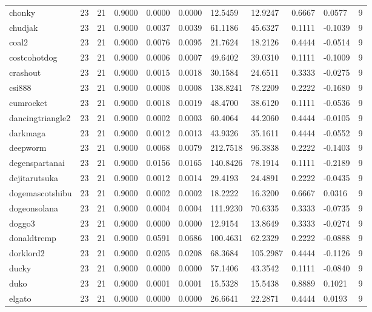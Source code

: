 \begin{table}[htbp]
\begin{tabular}{lllllllllll}
chonky & 23 & 21 & 0.9000 & 0.0000 & 0.0000 & 12.5459 & 12.9247 & 0.6667 & 0.0577 & 9 \\
chudjak & 23 & 21 & 0.9000 & 0.0037 & 0.0039 & 61.1186 & 45.6327 & 0.1111 & -0.1039 & 9 \\
coal2 & 23 & 21 & 0.9000 & 0.0076 & 0.0095 & 21.7624 & 18.2126 & 0.4444 & -0.0514 & 9 \\
costcohotdog & 23 & 21 & 0.9000 & 0.0006 & 0.0007 & 49.6402 & 39.0310 & 0.1111 & -0.1009 & 9 \\
crashout & 23 & 21 & 0.9000 & 0.0015 & 0.0018 & 30.1584 & 24.6511 & 0.3333 & -0.0275 & 9 \\
csi888 & 23 & 21 & 0.9000 & 0.0008 & 0.0008 & 138.8241 & 78.2209 & 0.2222 & -0.1680 & 9 \\
cumrocket & 23 & 21 & 0.9000 & 0.0018 & 0.0019 & 48.4700 & 38.6120 & 0.1111 & -0.0536 & 9 \\
dancingtriangle2 & 23 & 21 & 0.9000 & 0.0002 & 0.0003 & 60.4064 & 44.2060 & 0.4444 & -0.0105 & 9 \\
darkmaga & 23 & 21 & 0.9000 & 0.0012 & 0.0013 & 43.9326 & 35.1611 & 0.4444 & -0.0552 & 9 \\
deepworm & 23 & 21 & 0.9000 & 0.0068 & 0.0079 & 212.7518 & 96.3838 & 0.2222 & -0.1403 & 9 \\
degenspartanai & 23 & 21 & 0.9000 & 0.0156 & 0.0165 & 140.8426 & 78.1914 & 0.1111 & -0.2189 & 9 \\
dejitarutsuka & 23 & 21 & 0.9000 & 0.0012 & 0.0014 & 29.4193 & 24.4891 & 0.2222 & -0.0435 & 9 \\
dogemascotshibu & 23 & 21 & 0.9000 & 0.0002 & 0.0002 & 18.2222 & 16.3200 & 0.6667 & 0.0316 & 9 \\
dogeonsolana & 23 & 21 & 0.9000 & 0.0004 & 0.0004 & 111.9230 & 70.6335 & 0.3333 & -0.0735 & 9 \\
doggo3 & 23 & 21 & 0.9000 & 0.0000 & 0.0000 & 12.9154 & 13.8649 & 0.3333 & -0.0274 & 9 \\
donaldtremp & 23 & 21 & 0.9000 & 0.0591 & 0.0686 & 100.4631 & 62.2329 & 0.2222 & -0.0888 & 9 \\
dorklord2 & 23 & 21 & 0.9000 & 0.0205 & 0.0208 & 68.3684 & 105.2987 & 0.4444 & -0.1126 & 9 \\
ducky & 23 & 21 & 0.9000 & 0.0000 & 0.0000 & 57.1406 & 43.3542 & 0.1111 & -0.0840 & 9 \\
duko & 23 & 21 & 0.9000 & 0.0001 & 0.0001 & 15.5328 & 15.5438 & 0.8889 & 0.1021 & 9 \\
elgato & 23 & 21 & 0.9000 & 0.0000 & 0.0000 & 26.6641 & 22.2871 & 0.4444 & 0.0193 & 9 \\

\end{tabular}
\end{table}
